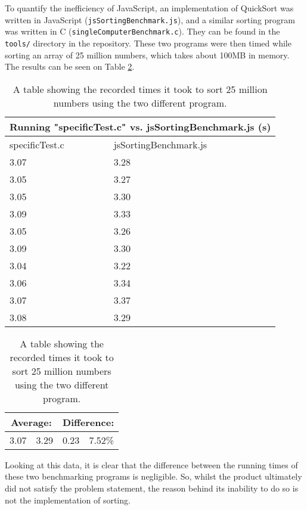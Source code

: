 To quantify the inefficiency of JavaScript, an implementation of QuickSort was written in JavaScript (\lstinline{jsSortingBenchmark.js}), and a similar sorting program was written in C (\lstinline{singleComputerBenchmark.c}). They can be found in the \lstinline{tools/} directory in the repository. These two programs were then timed while sorting an array of 25 million numbers, which takes about 100MB in memory. The results can be seen on Table \ref{tab:singleBenchmark}.

\begin{table}[H]
\begin{center}
\begin{tabular}{|p{5cm}|p{5cm}|}
    \hline
    \multicolumn{2}{|c|}{\textbf{Running "specificTest.c" vs. jsSortingBenchmark.js (s)}}\\
    \hline
    specificTest.c & jsSortingBenchmark.js \\
    \hline
    3.07 &3.28\\
    \hline
    3.05 &3.27\\
    \hline
    3.05 &3.30\\
    \hline
    3.09 &3.33\\
    \hline
    3.05 &3.26\\
    \hline
    3.09 &3.30\\
    \hline
    3.04 &3.22\\
    \hline
    3.06 &3.34\\
    \hline
    3.07 &3.37\\
    \hline
    3.08 &3.29\\
    \hline
\end{tabular}
\begin{tabular}{
|p{2.28cm}|p{2.28cm}|p{2.28cm}|p{2.28cm}|}
    \multicolumn{2}{|c|}{Average:} & \multicolumn{2}{|c|}{Difference:}\\
    \hline
    3.07 & 3.29 & 0.23 & 7.52\% \\
    \hline
\end{tabular}
\end{center}
\caption{A table showing the recorded times it took to sort 25 million numbers using the two different program.}
\label{tab:singleBenchmark}
\end{table}

Looking at this data, it is clear that the difference between the running times of these two benchmarking programs is negligible. So, whilst the product ultimately did not satisfy the problem statement, the reason behind its inability to do so is not the implementation of sorting. 